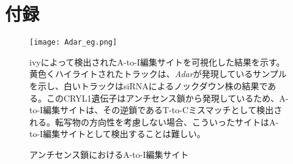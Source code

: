 \chapter*{付録} %
\renewcommand{\thechapter}{S} %
\setcounter{equation}{0} %
\setcounter{figure}{0} %

\begin{figure}[!ht]
  \begin{center}
    \texttt{[image: Adar\_eg.png]}
  \end{center}
  \caption{アンチセンス鎖におけるA-to-I編集サイト}
  \begin{flushleft}
    \small{ivyによって検出されたA-to-I編集サイトを可視化した結果を示す。黄色くハイライトされたトラックは、\textit{Adar}が発現しているサンプルを示し、白いトラックはsiRNAによるノックダウン株の結果である。このCRYL1遺伝子はアンチセンス鎖から発現しているため、A-to-I編集サイトは、その逆鎖であるT-to-Cミスマッチとして検出される。転写物の方向性を考慮しない場合、こういったサイトはA-to-I編集サイトとして検出することは難しい。}
  \end{flushleft}
  \label{fig:visual}
\end{figure}

